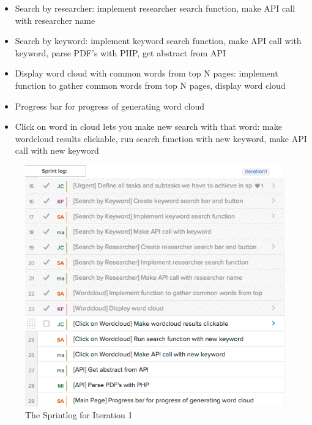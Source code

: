 \documentclass[]{article}
\begin{document}
\begin{itemize}
  \begin{itemize}
  \itemsep1pt\parskip0pt
  \item
    Search by researcher: implement researcher search function, make API
    call with researcher name
  \item
    Search by keyword: implement keyword search function, make API call
    with keyword, parse PDF's with PHP, get abstract from API
  \item
    Display word cloud with common words from top N pages: implement
    function to gather common words from top N pages, display word cloud
  \item
    Progress bar for progress of generating word cloud
  \item
    Click on word in cloud lets you make new search with that word: make
    wordcloud results clickable, run search function with new keyword,
    make API call with new keyword
  \end{itemize}
\end{itemize}

\begin{figure}[htbp]
\centering
\includegraphics{sprintlog.png}
\caption{The Sprintlog for Iteration 1}
\end{figure}
\end{document}
